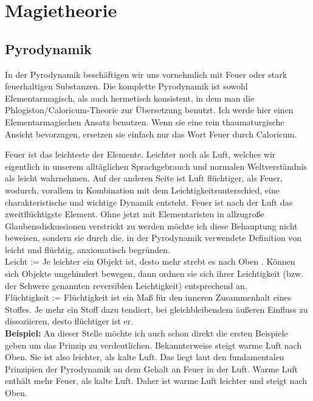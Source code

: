 \documentclass[a5paper,8pt]{book}
\begin{document}
\tableofcontents



\chapter{Magietheorie}

\section{Pyrodynamik}


In der Pyrodynamik beschäftigen wir uns vornehmlich mit Feuer oder stark feuerhaltigen Substanzen. Die komplette Pyrodynamik 
ist sowohl Elementarmagisch, als auch hermetisch konsistent, in dem man die Phlogiston/Caloricum-Theorie zur Übersetzung 
benutzt. Ich werde hier einen Elementarmagischen Ansatz benutzen. Wenn sie eine rein thaumaturgische Ansicht bevorzugen, 
ersetzen 
sie einfach nur das Wort Feuer durch Caloricum.

Feuer ist das leichteste der Elemente. Leichter noch als Luft, welches wir eigentlich in unserem alltäglichen Sprachgebrauch 
und normalen Weltverständnis als leicht wahrnehmen. Auf der anderen Seite ist Luft flüchtiger, als Feuer, wodurch, vorallem 
in Kombination mit dem Leichtigkeitsunterschied, eine charakteristische und wichtige Dynamik entsteht. Feuer ist nach der 
Luft das zweitflüchtigste Element.
Ohne jetzt mit Elementaristen in allzugroße Glaubensdiskussionen verstrickt zu werden möchte ich diese Behauptung nicht 
beweisen, sondern sie durch die, in der Pyrodynamik verwendete Definition von leicht und flüchtig, anxiomatisch begründen.\\

Leicht := Je leichter ein Objekt ist, desto mehr strebt es nach Oben \footnotemark[1].
Können sich Objekte ungehindert bewegen, dann ordnen sie sich ihrer Leichtigkeit (bzw. der Schwere genannten reversiblen 
Leichtigkeit) entsprechend an.\\

Flüchtigkeit := Flüchtigkeit ist ein Maß für den inneren Zusammenhalt eines Stoffes. Je mehr ein Stoff dazu tendiert, bei 
gleichbleibendem äußeren Einfluss zu dissoziieren, desto flüchtiger ist er.\\

\textbf{Beispiel:}
An dieser Stelle möchte ich auch schon direkt die ersten Beispiele geben um das Prinzip zu verdeutlichen. Bekannterweise 
steigt warme Luft nach Oben. Sie ist also leichter, als kalte Luft. Das liegt laut den fundamentalen Prinzipien der 
Pyrodynamik an dem Gehalt an Feuer in der Luft. Warme Luft enthält mehr Feuer, als kalte Luft. Daher ist warme Luft 
leichter und steigt nach Oben.\\
\end{document}

